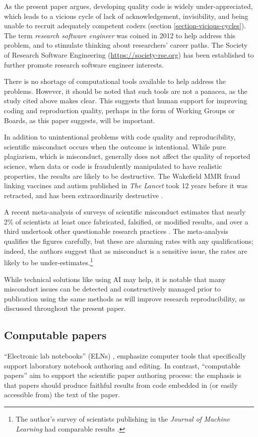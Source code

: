 \documentclass{comjnl}
\begin{document}
As the present paper argues, developing quality code is widely under-appreciated, which leads to a vicious cycle of lack of acknowledgement, invisibility, and being unable to recruit adequately competent coders (section \ref{section-vicious-cycles}). The term \emph{research software engineer\/} was coined in 2012 to help address this problem, and to stimulate thinking about researchers' career paths. The Society of Research Software Engineering (\url{https://society-rse.org}) has been established to further promote research software engineer interests.  

There is no shortage of computational tools available to help address the problems. However, it should be noted that such tools are not a panacea, as the study \cite{jupyter-study} cited above makes clear. This suggests that human support for improving coding and reproduction quality, perhaps in the form of Working Groups or Boards, as this paper suggests, will be important.

In addition to unintentional problems with code quality and reproducibility, scientific misconduct occurs when the outcome is intentional. While pure plagiarism, which is misconduct, generally does not affect the quality of reported science, when data or code is fraudulently manipulated to have realistic properties, the results are likely to be destructive. The Wakefield MMR fraud linking vaccines and autism published in \emph{The Lancet\/} took 12 years before it was retracted, and has been extraordinarily destructive \cite{MMR-fraud}. 

A recent meta-analysis of surveys of scientific misconduct estimates that nearly 2\% of scientists at least once fabricated, falsified, or modified results, and over a third undertook other questionable research practices \cite{misconduct-issues}. The meta-analysis qualifies the figures carefully, but these are alarming rates with any qualifications; indeed, the authors suggest that as misconduct is a sensitive issue, the rates are likely to be under-estimates.\footnote{The author's survey of scientists publishing in the \emph{Journal of Machine Learning\/} had comparable results \cite{machine-learning-reproducibility}.} 

While technical solutions like using AI may help, it is notable that many misconduct issues can be detected and constructively managed prior to publication using the same methods as will improve research reproducibility, as discussed throughout the present paper.

\subsection{Computable papers}\label{computable-papers}
``Electronic lab notebooks'' (ELNs) \cite{elns}, emphasize computer tools that specifically support laboratory notebook authoring and editing. In contrast, ``computable papers'' aim to support the scientific paper authoring process: the emphasis is that papers should produce faithful results from code embedded in (or easily accessible from) the text of the paper. 
\end{document}
